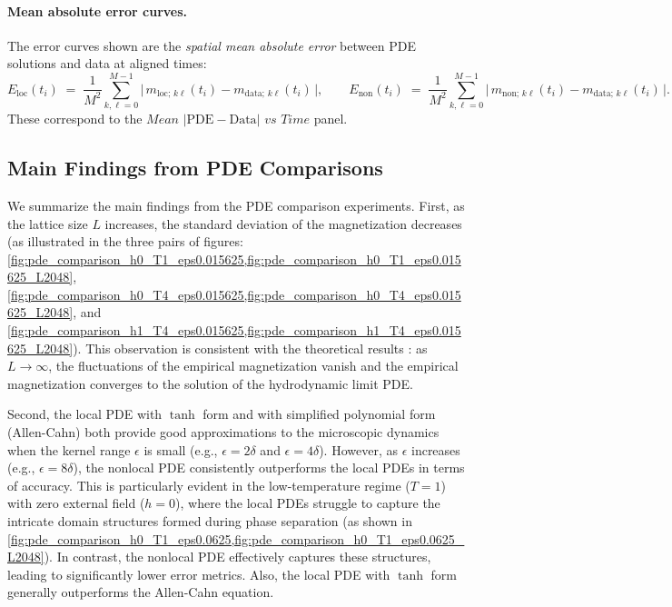 \documentclass[11pt,a4paper]{article}
\begin{document}
\paragraph{Mean absolute error curves.} The error curves shown are the \emph{spatial mean absolute error} between PDE solutions and data at aligned times:
\begin{equation}
    E_{\text{loc}}(t_i) \;=\; \frac{1}{M^2} \sum_{k,\ell=0}^{M-1} \big|\, m_{\text{loc};\,k\ell}(t_i) - m_{\text{data};\,k\ell}(t_i) \,\big|,
    \qquad
    E_{\text{non}}(t_i) \;=\; \frac{1}{M^2} \sum_{k,\ell=0}^{M-1} \big|\, m_{\text{non};\,k\ell}(t_i) - m_{\text{data};\,k\ell}(t_i) \,\big|.
\end{equation}
These correspond to the $\textit{Mean $|\mathrm{PDE}-\mathrm{Data}|$ vs Time}$ panel.

\subsection{Main Findings from PDE Comparisons}
\label{subsec:main_findings}
We summarize the main findings from the PDE comparison experiments.
First, as the lattice size $L$ increases, the standard deviation of the magnetization decreases 
(as illustrated in the three pairs of figures: 
\cref{fig:pde_comparison_h0_T1_eps0.015625,fig:pde_comparison_h0_T1_eps0.015625_L2048}, 
\cref{fig:pde_comparison_h0_T4_eps0.015625,fig:pde_comparison_h0_T4_eps0.015625_L2048}, 
and \cref{fig:pde_comparison_h1_T4_eps0.015625,fig:pde_comparison_h1_T4_eps0.015625_L2048}). 
This observation is consistent with the theoretical results : as $L \to \infty$, the fluctuations of the empirical magnetization vanish and the empirical magnetization converges to the solution of the hydrodynamic limit PDE.

Second, the local PDE with $\tanh$ form and with simplified polynomial form (Allen-Cahn) both provide good approximations to the microscopic dynamics when the kernel range $\epsilon$ is small (e.g., $\epsilon=2\delta$ and $\epsilon=4\delta$). 
However, as $\epsilon$ increases (e.g., $\epsilon=8\delta$), the nonlocal PDE consistently outperforms the local PDEs in terms of accuracy. 
This is particularly evident in the low-temperature regime ($T=1$) with zero external field ($h=0$), where the local PDEs struggle to capture the intricate domain structures formed during phase separation (as shown in \cref{fig:pde_comparison_h0_T1_eps0.0625,fig:pde_comparison_h0_T1_eps0.0625_L2048}). 
In contrast, the nonlocal PDE effectively captures these structures, leading to significantly lower error metrics.
Also, the local PDE with $\tanh$ form generally outperforms the Allen-Cahn equation.
\end{document}
